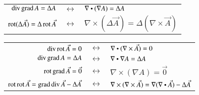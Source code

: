 \begin{center}
    \begin{tabular}[]{r c l}
        $ \operatorname{div} \operatorname{grad} A = \Delta A $ & $\leftrightarrow$ & $ \nabla \dotp (\nabla A) = \Delta A $ \\
        $ \operatorname{rot} (\Delta \vec{A}) = \Delta \operatorname{rot} \vec{A} $ & $\leftrightarrow$ & $ \nabla \times (\Delta \vec{A}) = \Delta (\nabla \times \vec{A}) $ \\
    \end{tabular}
\end{center}

\begin{center}
    \begin{tabular}[]{r c l}
        $ \operatorname{div} \operatorname{rot} \vec{A} = 0 $ & $\leftrightarrow$ & $ \nabla \dotp (\nabla \times \vec{A}) = 0 $ \\
        $ \operatorname{div} \operatorname{grad} A = \Delta A $ & $\leftrightarrow$ & $\nabla \dotp \nabla A = \Delta A $ \\
        $ \operatorname{rot} \operatorname{grad} \vec{A} = \vec{0} $ & $\leftrightarrow$ & $ \nabla \times (\nabla A) = \vec{0} $ \\
        $ \operatorname{rot} \operatorname{rot} \vec{A} = \operatorname{grad} \operatorname{div} \vec{A} - \Delta \vec{A} $ & $\leftrightarrow$ & $\nabla \times (\nabla \times \vec{A}) = \nabla (\nabla \dotp \vec{A}) - \Delta \vec{A} $ \\
    \end{tabular}
\end{center}

%
%